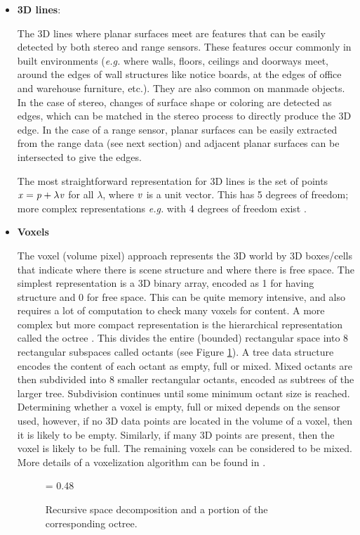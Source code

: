 \documentclass[twocolumn,oneside]{book}
\begin{document}
\begin{itemize}
\item {\bf 3D lines}:
  
  The 3D lines where planar surfaces meet are features that can be
  easily detected by both stereo and range sensors.  These features
  occur commonly in built environments ({\it e.g.} where walls,
  floors, ceilings and doorways meet, around the edges of wall
  structures like notice boards, at the edges of office and warehouse
  furniture, etc.).  They are also common on manmade objects.  In the
  case of stereo, changes of surface shape or coloring are detected as
  edges, which can be matched in the stereo process to directly
  produce the 3D edge.  In the case of a range sensor, planar surfaces
  can be easily extracted from the range data (see next section) and
  adjacent planar surfaces can be intersected to give the edges.

  The most straightforward representation for 3D lines is the set of
  points $ {\bf \it x} = {\bf \it p} + \lambda {\bf \it v}$ for all
  $\lambda$, where ${\bf \it v}$ is a unit vector.  This has 5 degrees
  of freedom; more complex representations {\it e.g.} with 4 degrees
  of freedom exist \cite{hartley}.

\item {\bf Voxels}

  The  voxel (volume pixel) approach represents the 3D
  world by 3D boxes/cells that indicate where there is scene structure
  and where there is free space.  The simplest representation is a 3D
  binary array, encoded as 1 for having structure and 0 for free
  space.  This can be quite memory intensive, and also requires a lot
  of computation to check many voxels for content.  A more complex but
  more compact representation is the hierarchical representation
  called the octree \cite{foley}. This divides the entire (bounded)
  rectangular space into 8 rectangular subspaces called octants (see
  Figure \ref{octree}).  A tree data structure encodes the content of
  each octant as empty, full or mixed.  Mixed octants are then
  subdivided into 8 smaller rectangular octants, encoded as subtrees
  of the larger tree.  Subdivision continues until some minimum octant
  size is reached.  Determining whether a voxel is empty, full or
  mixed depends on the sensor used, however, if no 3D data points are
  located in the volume of a voxel, then it is likely to be empty.
  Similarly, if many 3D points are present, then the voxel is likely
  to be full.  The remaining voxels can be considered to be mixed.
  More details of a voxelization algorithm can be found in
  \cite{Curless}.
\begin{figure}
{\epsfxsize = 0.48\textwidth {}}
\caption{Recursive space decomposition and a portion of the corresponding octree.
\label{octree}}
\end{figure}


\end{itemize}
\end{document}
